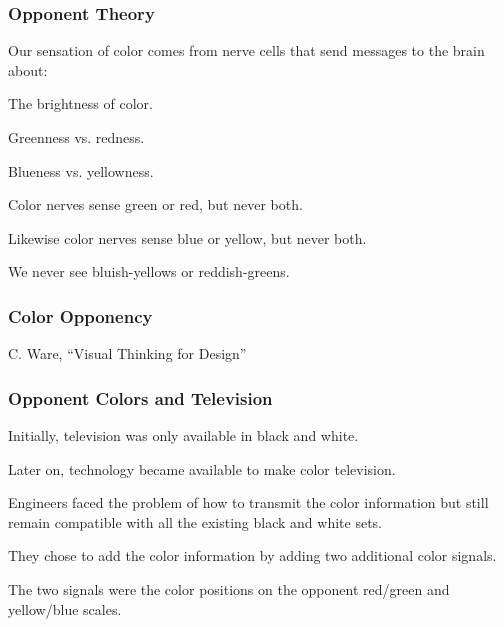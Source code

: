 \documentclass[12pt]{beamer}\usepackage[]{graphicx}\usepackage[]{color}
\begin{document}

\begin{frame}
\frametitle{Opponent Theory}

Our sensation of color comes from nerve cells that send messages to the brain about:

\bi
  \item The brightness of color.
  \item Greenness vs. redness. 
  \item Blueness vs. yellowness.
  \item Color nerves sense green or red, but never both.
  \item Likewise color nerves sense blue or yellow, but never both. 
  \item We never see bluish-yellows or reddish-greens.
\ei

\end{frame}


\begin{frame}
\frametitle{Color Opponency}
\begin{center}

{\scriptsize {\lolit C. Ware, ``Visual Thinking for Design''}}
\end{center}
\end{frame}


\begin{frame}
\frametitle{Opponent Colors and Television}

\bbi
  \item Initially, television was only available in black and white.
  \item Later on, technology became available to make color television.
  \item Engineers faced the problem of how to transmit the color information but still remain compatible with all the existing black and white sets.
  \item They chose to add the color information by adding two additional color signals.
  \item The two signals were the color positions on the opponent red/green and yellow/blue scales.
\ei

\end{frame}

\end{document}
